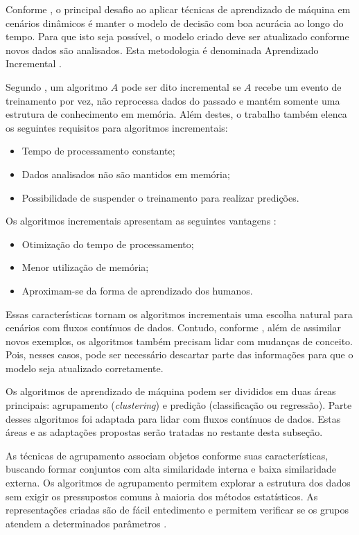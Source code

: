 \documentclass[qual, classic, a4paper]{ufbathesis}
\begin{document}
Conforme \cite{Gama:Rodrigues:2009}, o principal desafio ao aplicar técnicas de aprendizado de máquina em cenários dinâmicos é manter o modelo de decisão com boa acurácia ao longo do tempo.
Para que isto seja possível, o modelo criado deve ser atualizado conforme novos dados são analisados.
Esta metodologia é denominada Aprendizado Incremental \cite{Gama:2014:SCD:2597757.2523813}.

Segundo \cite{Langley:reimann1995learning}, um algoritmo $A$ pode ser dito incremental se $A$ recebe um evento de treinamento por vez,
não reprocessa dados do passado e mantém somente uma estrutura de conhecimento em memória. 
Além destes, o trabalho também elenca os seguintes requisitos para algoritmos incrementais:

\begin{itemize}
    \item Tempo de processamento constante;
    \item Dados analisados não são mantidos em memória;
    \item Possibilidade de suspender o treinamento para realizar predições.
\end{itemize}

Os algoritmos incrementais apresentam as seguintes vantagens \cite{pinto2005algoritmos}:

\begin{itemize}
    \item Otimização do tempo de processamento;
    \item Menor utilização de memória;
    \item Aproximam-se da forma de aprendizado dos humanos.
\end{itemize}

Essas características tornam os algoritmos incrementais uma escolha natural para cenários com fluxos contínuos de dados.
Contudo, conforme \cite{GamaMCR04}, além de assimilar novos exemplos, os algoritmos também precisam lidar com mudanças de conceito.
Pois, nesses casos, pode ser necessário descartar parte das informações para que o modelo seja atualizado corretamente.

Os algoritmos de aprendizado de máquina podem ser divididos em duas áreas principais: agrupamento (\textit{clustering}) e predição (classificação ou regressão).
Parte desses algoritmos foi adaptada para lidar com fluxos contínuos de dados.
Estas áreas e as adaptações propostas serão tratadas no restante desta subseção.

As técnicas de agrupamento associam objetos conforme suas características, buscando formar conjuntos com alta similaridade interna e baixa similaridade externa.
Os algoritmos de agrupamento permitem explorar a estrutura dos dados sem exigir os pressupostos comuns à maioria dos métodos estatísticos.
As representações criadas são de fácil entedimento e permitem verificar se os grupos atendem a determinados parâmetros \cite{Jain:1988:ACD:46712}.
\end{document}

